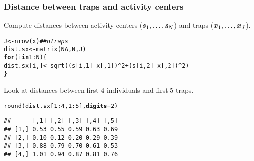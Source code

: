 \documentclass[color=usenames,dvipsnames]{beamer}\usepackage[]{graphicx}\usepackage[]{color}
\makeatletter
\newcommand{\hlnum}[1]{\textcolor[rgb]{0.69,0.494,0}{#1}}%
\newcommand{\hlcom}[1]{\textcolor[rgb]{0.514,0.506,0.514}{\textit{#1}}}%
\newcommand{\hlopt}[1]{\textcolor[rgb]{0,0,0}{#1}}%
\newcommand{\hlstd}[1]{\textcolor[rgb]{0,0,0}{#1}}%
\newcommand{\hlkwa}[1]{\textcolor[rgb]{0,0,0}{\textbf{#1}}}%
\newcommand{\hlkwb}[1]{\textcolor[rgb]{0,0.341,0.682}{#1}}%
\newcommand{\hlkwc}[1]{\textcolor[rgb]{0,0,0}{\textbf{#1}}}%
\newcommand{\hlkwd}[1]{\textcolor[rgb]{0.004,0.004,0.506}{#1}}%
\newenvironment{kframe}{%
 \def\at@end@of@kframe{}%
 \ifinner\ifhmode%
  \def\at@end@of@kframe{\end{minipage}}%
  \begin{minipage}{\columnwidth}%
 \fi\fi%
 \def\FrameCommand##1{\hskip\@totalleftmargin \hskip-\fboxsep
 \colorbox{shadecolor}{##1}\hskip-\fboxsep
     \hskip-\linewidth \hskip-\@totalleftmargin \hskip\columnwidth}%
 \MakeFramed {\advance\hsize-\width
   \@totalleftmargin\z@ \linewidth\hsize
   \@setminipage}}%
 {\par\unskip\endMakeFramed%
 \at@end@of@kframe}
\newenvironment{knitrout}{}{} %
\makeatother
\begin{document}
\begin{frame}[fragile]
  \frametitle{Distance between traps and activity centers}
  Compute distances between activity centers (${\bm s}_1, \dots, {\bm s}_N$)
  and traps (${\bm x}_1, \dots, {\bm x}_J$).
\begin{knitrout}\footnotesize
{}\color{fgcolor}\begin{kframe}
\begin{alltt}
\hlstd{J} \hlkwb{<-} \hlkwd{nrow}\hlstd{(x)}                 \hlcom{## nTraps}
\hlstd{dist.sx} \hlkwb{<-} \hlkwd{matrix}\hlstd{(}\hlnum{NA}\hlstd{, N, J)}
\hlkwa{for}\hlstd{(i} \hlkwa{in} \hlnum{1}\hlopt{:}\hlstd{N) \{}
    \hlstd{dist.sx[i,]} \hlkwb{<-} \hlkwd{sqrt}\hlstd{((s[i,}\hlnum{1}\hlstd{]}\hlopt{-}\hlstd{x[,}\hlnum{1}\hlstd{])}\hlopt{^}\hlnum{2} \hlopt{+} \hlstd{(s[i,}\hlnum{2}\hlstd{]}\hlopt{-}\hlstd{x[,}\hlnum{2}\hlstd{])}\hlopt{^}\hlnum{2}\hlstd{)}
\hlstd{\}}
\end{alltt}
\end{kframe}
\end{knitrout}
\pause
\vfill
  Look at distances between first 4 individuals and first 5 traps.
\begin{knitrout}\footnotesize
{}\color{fgcolor}\begin{kframe}
\begin{alltt}
\hlkwd{round}\hlstd{(dist.sx[}\hlnum{1}\hlopt{:}\hlnum{4}\hlstd{,}\hlnum{1}\hlopt{:}\hlnum{5}\hlstd{],} \hlkwc{digits}\hlstd{=}\hlnum{2}\hlstd{)}
\end{alltt}
\begin{verbatim}
##      [,1] [,2] [,3] [,4] [,5]
## [1,] 0.53 0.55 0.59 0.63 0.69
## [2,] 0.10 0.12 0.20 0.29 0.39
## [3,] 0.88 0.79 0.70 0.61 0.53
## [4,] 1.01 0.94 0.87 0.81 0.76
\end{verbatim}
\end{kframe}
\end{knitrout}

\end{frame}
\end{document}
